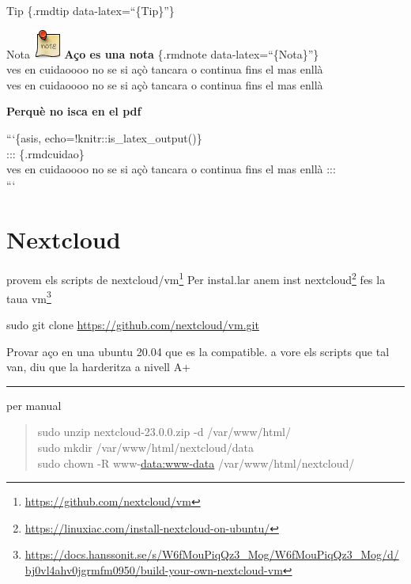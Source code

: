\documentclass[
  10pt,
]{krantz}
\DeclareRobustCommand{\href}[2]{#2\footnote{\url{#1}}}
\begin{document}
\begin{rmdtip}{Tip}
\{.rmdtip data-latex=``\{Tip\}''\}

\end{rmdtip}

\begin{rmdnote}{Nota}
\includegraphics{imatges/note.png} \textbf{Aço es una nota} \{.rmdnote data-latex=``\{Nota\}''\}\\
ves en cuidaoooo no se si açò tancara o continua fins el mas enllà\\
ves en cuidaoooo no se si açò tancara o continua fins el mas enllà

\end{rmdnote}

\begin{rmdinfo}{}
\textbf{Perquè no isca en el pdf}

```\{asis, echo=!knitr::is\_latex\_output()\}\\
::: \{.rmdcuidao\}\\
ves en cuidaoooo no se si açò tancara o continua fins el mas enllà :::\\
```

\end{rmdinfo}

\hypertarget{nextcloud}{%
\chapter{Nextcloud}\label{nextcloud}}

provem els scripts de \href{https://github.com/nextcloud/vm}{nextcloud/vm} Per instal.lar anem \href{https://linuxiac.com/install-nextcloud-on-ubuntu/}{inst nextcloud} fes la taua \href{https://docs.hanssonit.se/s/W6fMouPiqQz3_Mog/W6fMouPiqQz3_Mog/d/bj0vl4ahv0jgrmfm0950/build-your-own-nextcloud-vm}{vm}

sudo git clone \url{https://github.com/nextcloud/vm.git}

Provar aço en una ubuntu 20.04 que es la compatible. a vore els scripts que tal van, diu que la harderitza a nivell A+

\begin{center}\rule{0.5\linewidth}{0.5pt}\end{center}

per manual

\begin{quote}
sudo unzip nextcloud-23.0.0.zip -d /var/www/html/\\
sudo mkdir /var/www/html/nextcloud/data\\
sudo chown -R www-\url{data:www-data} /var/www/html/nextcloud/
\end{quote}
\end{document}
